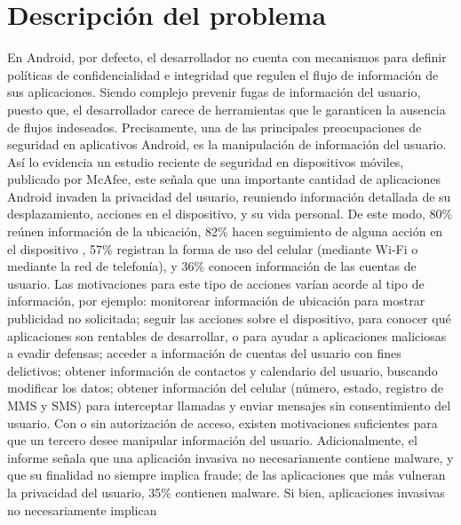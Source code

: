 \label{ch:problema}
\chapter{Descripción del problema}

En Android, por defecto, el desarrollador no cuenta con mecanismos para
definir políticas de confidencialidad e integridad que regulen
el flujo de información de sus aplicaciones. Siendo complejo prevenir fugas de
información del usuario, puesto que, el desarrollador carece de herramientas que
le garanticen la ausencia de flujos indeseados.\newline
Precisamente, una de las principales preocupaciones de seguridad en aplicativos
Android, es la manipulación de información del usuario.
Así lo evidencia un
estudio reciente de seguridad en dispositivos móviles, publicado por
McAfee\cite{McAfeeReport}, este señala  que una importante cantidad de
aplicaciones Android invaden la privacidad del usuario, reuniendo información
detallada de su desplazamiento, acciones en el dispositivo, y su vida personal.
De este modo, 80\% reúnen información de la ubicación, 82\%
hacen seguimiento de alguna acción en el dispositivo , 57\%
registran la forma de uso del celular (mediante Wi-Fi o
mediante la red de telefonía), y 36\% conocen información de
las cuentas de usuario.\newline
Las motivaciones para este tipo de acciones varían acorde al tipo de
información, por ejemplo: monitorear información de ubicación para mostrar
publicidad no solicitada; seguir las acciones sobre el dispositivo, para conocer
qué aplicaciones son rentables de desarrollar, o para ayudar a aplicaciones
maliciosas a evadir defensas; acceder a información de cuentas del usuario con
fines delictivos; obtener información de contactos y calendario
del usuario, buscando modificar los datos; obtener información del celular 
(número, estado, registro de MMS y SMS) para interceptar llamadas y enviar
mensajes sin consentimiento del usuario.\newline
Con o sin autorización de acceso, existen motivaciones suficientes para que un
tercero desee manipular información del usuario.\newline
Adicionalmente, el informe señala que una aplicación invasiva no necesariamente
contiene malware, y que su finalidad no siempre implica fraude; de las
aplicaciones que más vulneran la privacidad del usuario, 35\% contienen
malware.\newline 
Si bien, aplicaciones invasivas no necesariamente implican
